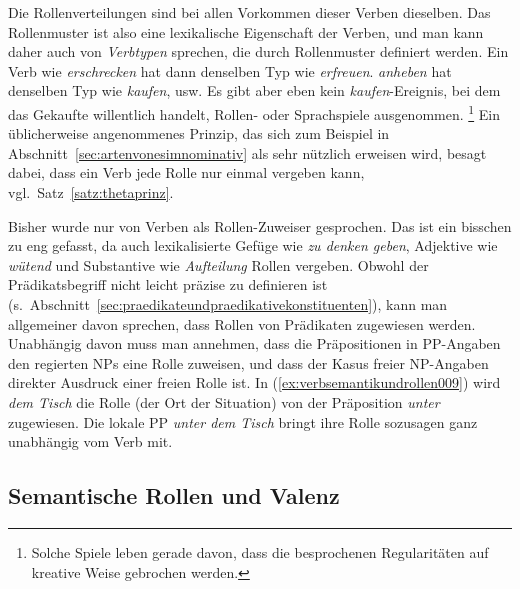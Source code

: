 Die Rollenverteilungen sind bei allen Vorkommen dieser Verben dieselben.
Das Rollenmuster ist also eine lexikalische Eigenschaft der Verben, und man kann daher auch von \textit{Verbtypen} sprechen, die durch Rollenmuster definiert werden.
Ein Verb wie \textit{erschrecken} hat dann denselben Typ wie \textit{erfreuen}.
\textit{anheben} hat denselben Typ wie \textit{kaufen}, usw.
Es gibt aber eben kein \textit{kaufen}-Ereignis, bei dem das Gekaufte willentlich handelt, Rollen- oder Sprachspiele ausgenommen.%
\footnote{Solche Spiele leben gerade davon, dass die besprochenen Regularitäten auf kreative Weise gebrochen werden.}
Ein üblicherweise angenommenes Prinzip, das sich zum Beispiel in Abschnitt~\ref{sec:artenvonesimnominativ} als sehr nützlich erweisen wird, besagt dabei, dass ein Verb jede Rolle nur einmal vergeben kann, vgl.\ Satz~\ref{satz:thetaprinz}.


Bisher wurde nur von Verben als Rollen-Zuweiser gesprochen.
Das ist ein bisschen zu eng gefasst, da auch lexikalisierte Gefüge wie \textit{zu denken geben}, Adjektive wie \textit{wütend} und Substantive wie \textit{Aufteilung} Rollen vergeben.
Obwohl der Prädikatsbegriff nicht leicht präzise zu definieren ist (s.\ Abschnitt~\ref{sec:praedikateundpraedikativekonstituenten}), kann man allgemeiner davon sprechen, dass Rollen von Prädikaten zugewiesen werden.
Unabhängig davon muss man annehmen, dass die Präpositionen in PP-Angaben den regierten NPs eine Rolle zuweisen, und dass der Kasus freier NP-Angaben direkter Ausdruck einer freien Rolle ist.
In (\ref{ex:verbsemantikundrollen009}) wird \textit{dem Tisch} die Rolle (der Ort der Situation) von der Präposition \textit{unter} zugewiesen.
Die lokale PP \textit{unter dem Tisch} bringt ihre Rolle sozusagen ganz unabhängig vom Verb mit.

\begin{exe}
\end{exe}

\subsection{Semantische Rollen und Valenz}
\label{sec:semantischerollenundvalenz}

